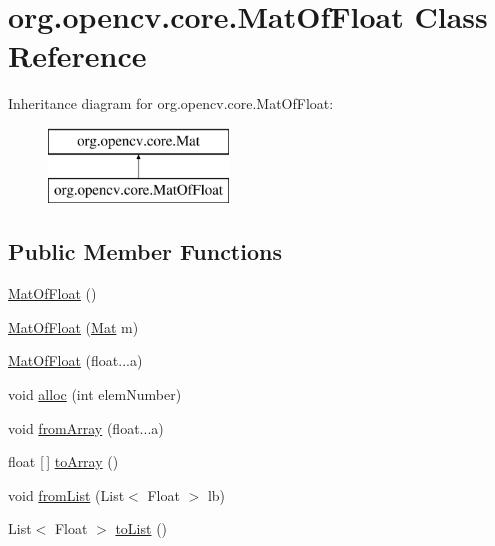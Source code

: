 \hypertarget{classorg_1_1opencv_1_1core_1_1_mat_of_float}{}\section{org.\+opencv.\+core.\+Mat\+Of\+Float Class Reference}
\label{classorg_1_1opencv_1_1core_1_1_mat_of_float}
Inheritance diagram for org.\+opencv.\+core.\+Mat\+Of\+Float\+:\begin{figure}[H]
\begin{center}
\leavevmode
\includegraphics[height=2.000000cm]{classorg_1_1opencv_1_1core_1_1_mat_of_float}
\end{center}
\end{figure}
\subsection*{Public Member Functions}
\begin{DoxyCompactItemize}
\item 
\mbox{\hyperlink{classorg_1_1opencv_1_1core_1_1_mat_of_float_ae7fb4b429ea3c460719c8015d9a7b78a}{Mat\+Of\+Float}} ()
\item 
\mbox{\hyperlink{classorg_1_1opencv_1_1core_1_1_mat_of_float_a7e63a23be1d317996237db3e28390c19}{Mat\+Of\+Float}} (\mbox{\hyperlink{classorg_1_1opencv_1_1core_1_1_mat}{Mat}} m)
\item 
\mbox{\hyperlink{classorg_1_1opencv_1_1core_1_1_mat_of_float_a202b609426e4cc4f3e71db11fef408a1}{Mat\+Of\+Float}} (float...\+a)
\item 
void \mbox{\hyperlink{classorg_1_1opencv_1_1core_1_1_mat_of_float_adf7d462ccf7df5011f58be061e9b648e}{alloc}} (int elem\+Number)
\item 
void \mbox{\hyperlink{classorg_1_1opencv_1_1core_1_1_mat_of_float_a503f0eb068ab3f7558d8498c0f038e77}{from\+Array}} (float...\+a)
\item 
float \mbox{[}$\,$\mbox{]} \mbox{\hyperlink{classorg_1_1opencv_1_1core_1_1_mat_of_float_a3b3ddae0856a17d0a2971ad5a509b8b1}{to\+Array}} ()
\item 
void \mbox{\hyperlink{classorg_1_1opencv_1_1core_1_1_mat_of_float_ad56e1de57b3e9d8185e3e18d03360980}{from\+List}} (List$<$ Float $>$ lb)
\item 
List$<$ Float $>$ \mbox{\hyperlink{classorg_1_1opencv_1_1core_1_1_mat_of_float_ad86105ff8d80414805f608355c3775f3}{to\+List}} ()
\end{DoxyCompactItemize}
